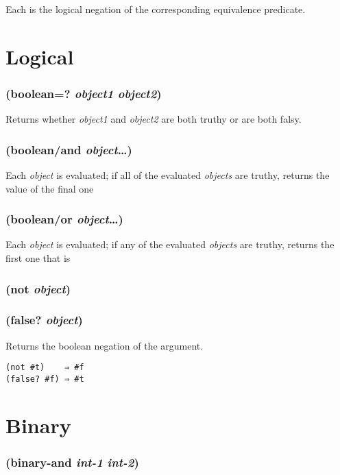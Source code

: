 \documentclass{article}
\begin{document}
Each is the logical negation of the corresponding equivalence predicate.

\section{Logical}\label{sec:logical}

\subsubsection{(boolean=? \emph{object1} \emph{object2})}

Returns whether \emph{object1} and \emph{object2} are both truthy or are both falsy.

\subsubsection{(boolean/and \emph{object}\ldots{})}

Each \emph{object} is evaluated; if all of the evaluated \emph{objects} are truthy, returns
the value of the final one

\subsubsection{(boolean/or \emph{object}\ldots{})}

Each \emph{object} is evaluated; if any of the evaluated \emph{objects} are truthy, returns
the first one that is

\subsubsection{(not \emph{object})}

\subsubsection{(false? \emph{object})}

Returns the boolean negation of the argument.

\begin{verbatim}
(not #t)    ⇒ #f
(false? #f) ⇒ #t
\end{verbatim}

\section{Binary}\label{sec:binary}

\subsubsection{(binary-and \emph{int-1} \emph{int-2})}
\end{document}
